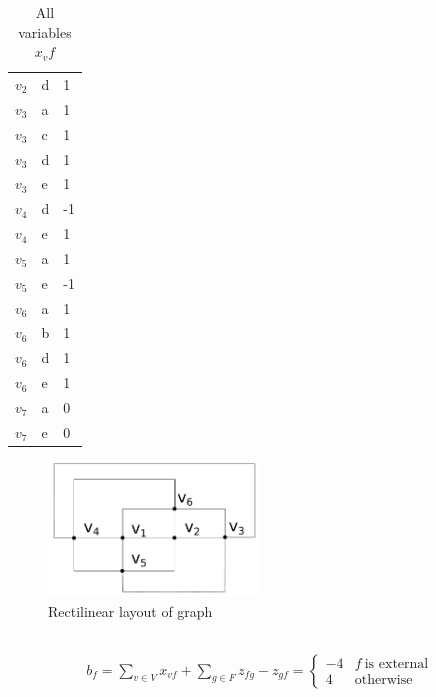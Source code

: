 \documentclass[11pt,a4paper,english]{article}
\begin{document}
\begin{table}
\begin{subtable}{0.5\textwidth}
\begin{tabular}{l | l | l}
            $v_2$   & d & 1 \\
            $v_3$   & a & 1 \\
            $v_3$   & c & 1 \\
            $v_3$   & d & 1 \\
            $v_3$   & e & 1 \\
            $v_4$   & d & -1 \\
            $v_4$   & e & 1 \\
            $v_5$   & a & 1 \\
            $v_5$   & e & -1 \\
            $v_6$   & a & 1 \\
            $v_6$   & b & 1 \\
            $v_6$   & d & 1 \\
            $v_6$   & e & 1 \\
            $v_7$   & a & 0 \\
            $v_7$   & e & 0
        \end{tabular}
        \caption{All variables $x_vf$}
    \end{subtable}
\end{table}

\begin{figure}[h]
    \centering
    \includegraphics[width=0.5\textwidth]{rectilinear_layout.pdf}
    \caption{Rectilinear layout of graph}
\end{figure}

\subsection{}

\begin{align}
    b_f = \sum_{v \in V} x_{vf} + \sum_{g \in F} z_{fg} - z_{gf} = \begin{cases} -4 & f~\text{is external} \\ 4 & \text{otherwise}\end{cases}
\end{align}
\end{document}
